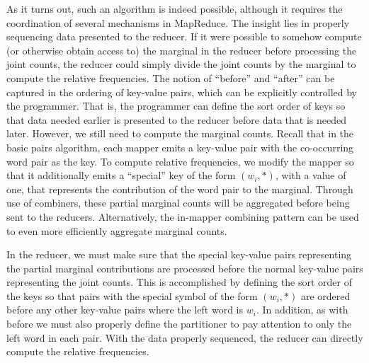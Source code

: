 \documentclass[11pt]{article}
\begin{document}
As it turns out, such an algorithm is indeed possible, although it
requires the coordination of several mechanisms in MapReduce.  The
insight lies in properly sequencing data presented to the reducer.  If
it were possible to somehow compute (or otherwise obtain access to)
the marginal in the reducer before processing the joint counts, the
reducer could simply divide the joint counts by the marginal to
compute the relative frequencies.  The notion of ``before'' and
``after'' can be captured in the ordering of key-value pairs, which
can be explicitly controlled by the programmer.  That is, the
programmer can define the sort order of keys so that data needed
earlier is presented to the reducer before data that is needed later.
However, we still need to compute the marginal counts.  Recall that in
the basic pairs algorithm, each mapper emits a key-value pair with the
co-occurring word pair as the key.  To compute relative frequencies,
we modify the mapper so that it additionally emits a ``special'' key
of the form $(w_i, \ast)$, with a value of one, that represents the
contribution of the word pair to the marginal.  Through use of
combiners, these partial marginal counts will be aggregated before
being sent to the reducers.  Alternatively, the in-mapper combining
pattern can be used to even more efficiently aggregate marginal
counts.

In the reducer, we must make sure that the special key-value pairs
representing the partial marginal contributions are processed before
the normal key-value pairs representing the joint counts.  This is
accomplished by defining the sort order of the keys so that pairs with
the special symbol of the form $(w_i, \ast)$ are ordered before any other
key-value pairs where the left word is $w_i$.  In addition, as with
before we must also properly define the partitioner to pay attention
to only the left word in each pair.  With the data properly sequenced,
the reducer can directly compute the relative frequencies.
\end{document}
